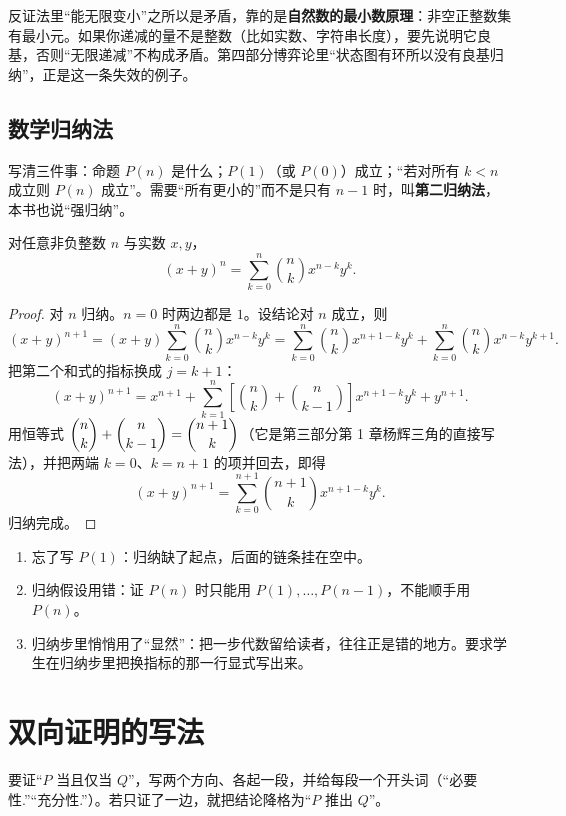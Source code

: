 \begin{pitfall}
反证法里“能无限变小”之所以是矛盾，靠的是\textbf{自然数的最小数原理}：非空正整数集有最小元。如果你递减的量不是整数（比如实数、字符串长度），要先说明它良基，否则“无限递减”不构成矛盾。第四部分博弈论里“状态图有环所以没有良基归纳”，正是这一条失效的例子。
\end{pitfall}

\subsection{数学归纳法}
写清三件事：命题 $P(n)$ 是什么；$P(1)$（或 $P(0)$）成立；“若对所有 $k<n$ 成立则 $P(n)$ 成立”。需要“所有更小的”而不是只有 $n-1$ 时，叫\textbf{第二归纳法}，本书也说“强归纳”。

\begin{theorem}[二项式定理的归纳证明]
对任意非负整数 $n$ 与实数 $x,y$，
\[
(x+y)^n=\sum_{k=0}^{n}\binom nk x^{n-k}y^{k}.
\]
\end{theorem}
\begin{proof}
对 $n$ 归纳。$n=0$ 时两边都是 $1$。设结论对 $n$ 成立，则
\[
(x+y)^{n+1}=(x+y)\sum_{k=0}^{n}\binom nk x^{n-k}y^{k}
=\sum_{k=0}^{n}\binom nk x^{n+1-k}y^{k}
 +\sum_{k=0}^{n}\binom nk x^{n-k}y^{k+1}.
\]
把第二个和式的指标换成 $j=k+1$：
\[
(x+y)^{n+1}=x^{n+1}+\sum_{k=1}^{n}\left[\binom nk+\binom n{k-1}\right]x^{n+1-k}y^{k}+y^{n+1}.
\]
用恒等式 $\dbinom nk+\dbinom n{k-1}=\dbinom{n+1}k$（它是第三部分第 1 章杨辉三角的直接写法），并把两端 $k=0$、$k=n+1$ 的项并回去，即得
\[
(x+y)^{n+1}=\sum_{k=0}^{n+1}\binom{n+1}{k}x^{n+1-k}y^{k}.
\]
归纳完成。
\end{proof}

\begin{teach}[归纳法的三个常见断点]
\begin{enumerate}
\item 忘了写 $P(1)$：归纳缺了起点，后面的链条挂在空中。
\item 归纳假设用错：证 $P(n)$ 时只能用 $P(1),\ldots,P(n-1)$，不能顺手用 $P(n)$。
\item 归纳步里悄悄用了“显然”：把一步代数留给读者，往往正是错的地方。要求学生在归纳步里把换指标的那一行显式写出来。
\end{enumerate}
\end{teach}

\section{双向证明的写法}
要证“$P$ 当且仅当 $Q$”，写两个方向、各起一段，并给每段一个开头词（“必要性.”“充分性.”）。若只证了一边，就把结论降格为“$P$ 推出 $Q$”。

